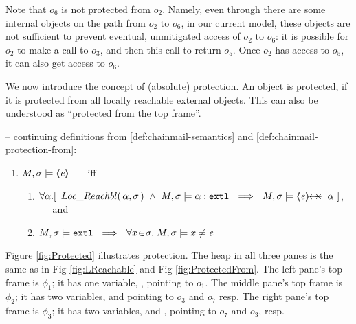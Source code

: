 {{ 

Note that $o_6$ is not protected from $o_2$. 
Namely, even through there are some internal objects on the path from $o_2$ to $o_6$, in our current model, these objects are not sufficient to prevent eventual, unmitigated access of $o_2$ to $o_6$: it is possible for $o_2$ to make a call to $o_3$, and then this call to return $o_5$. Once $o_2$ has access to $o_5$, it can also get access to $o_6$. 

\vspace{.1in}

We now introduce the concept of (absolute) protection.
An object is protected, if it is protected from all locally reachable {external} objects. This can also be understood as 
``protected from the top frame''. 
 
\begin{definition} 
\label{def:chainmail-protection}
\label{sect:semantics:assert:prt}
-- continuing definitions from \ref{def:chainmail-semantics} and \ref{def:chainmail-protection-from}:
\begin{enumerate}
\item
$M , \sigma \models \langle\!\!\langle \mathit{e} \rangle\!\!\rangle$  \ \ \ iff \ \ \ 
\begin{enumerate}
\item
{$\forall \alpha.[ \  \LRelevant {\alpha}  {\sigma}\ \wedge\ { \satisfiesA{M}{\sigma}{\external \alpha}} \ \ \Longrightarrow \ \  \satisfiesA{M}{\sigma}{\protectedFrom{\re} {{\alpha}}}\ ] $}, \ \ \ and 
\item
$\satisfiesA{M}{\sigma}{\extThis}\ \ \Longrightarrow\ \ \forall x\!\in\! \sigma.\ \satisfiesA{M}{\sigma}{x\neq \re}$
\end{enumerate}
\end{enumerate}
\end{definition} 
 
  Figure \ref{fig:Protected} illustrates %
  protection. The heap in all three panes is the same as in  Fig \ref{fig:LReachable} and 
 Fig \ref{fig:ProtectedFrom}. The left pane's  top frame is $\phi_1$; it has  one variable, , pointing to $o_1$.  The middle pane's  top frame is $\phi_2$; it has two  variables,    and  pointing to $o_3$ and  $o_7$ resp. The right pane's  top frame is $\phi_3$; it has two  variables,   and , pointing to $o_7$ and $o_3$, resp.  

}}
